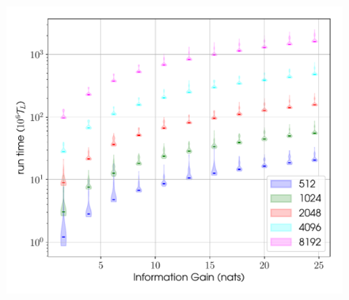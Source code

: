 \begin{figure}[!phtb]
\begin{center}
\includegraphics[width=1\columnwidth]{./figures/proptesting/walk_uniform_prop/timing/collate_plots_wup_timings}
\caption{ \protect}
\end{center}
\end{figure}
